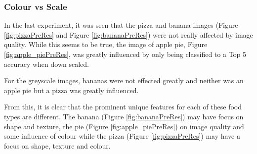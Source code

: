 \subsubsection*{Colour vs Scale}
In the last experiment, it was seen that the pizza and banana images (Figure \ref{fig:pizzaPreRes} and Figure \ref{fig:bananaPreRes}) were not really affected by image quality. While this seems to be true, the image of apple pie, Figure \ref{fig:apple_piePreRes}, was greatly influenced by only being classified to a Top 5 accuracy when down scaled.

For the greyscale images, bananas were not effected greatly and neither was an apple pie but a pizza was greatly influenced.

From this, it is clear that the prominent unique features for each of these food types are different. The banana (Figure \ref{fig:bananaPreRes}) may have focus on shape and texture, the pie (Figure \ref{fig:apple_piePreRes}) on image quality and some influence of colour while the pizza (Figure \ref{fig:pizzaPreRes}) may have a focus on shape, texture and colour.

